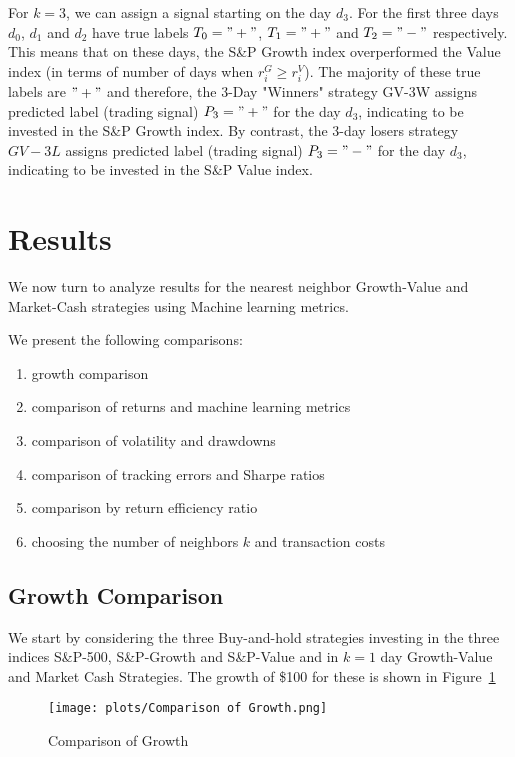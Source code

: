 \documentclass{article}
\begin{document}
For $k=3$,  we can assign a signal starting on the day $d_{3}$. For the first three 
days $d_{0}$, $d_{1}$ and $d_{2}$ have true labels 
$T_{0}="+"$, $T_{1}="+"$ and $T_{2}="-"$ respectively. This means that on these days, 
the S{\&}P  Growth index overperformed the Value index (in terms of number of days 
when $r_{i}^{G} \geq r_{i}^{V}$). The majority of these true labels are $"+"$ and 
therefore, the 3-Day "Winners" strategy GV-3W assigns predicted label 
(trading signal) $P_{3}="+"$ for the day $d_{3}$, indicating to be invested in
the S{\&}P Growth index. By contrast, the 3-day losers strategy $GV-3L$ assigns 
predicted label (trading signal) $P_{3}="-"$ for the day $d_{3}$, indicating to 
be invested in the S{\&}P Value index. 


\section{Results}\label{section:results}

We now turn to analyze results for the nearest neighbor Growth-Value and 
Market-Cash strategies using Machine learning metrics.
\medskip

We present the following comparisons:
\begin{enumerate}[nosep]
    \item growth comparison
    \item comparison of returns and machine learning metrics
    \item comparison of volatility and drawdowns
    \item comparison of tracking errors and Sharpe ratios
    \item comparison by return efficiency ratio
    \item choosing the number of neighbors $k$ and transaction costs
\end{enumerate}

\subsection{Growth Comparison}\label{subsec:growth_comparison}

We start by considering the three Buy-and-hold strategies investing in the three 
indices S{\&}P-500, S{\&}P-Growth and S{\&}P-Value and in $k=1$ day Growth-Value 
and Market Cash Strategies. 
The growth of {\$}100 for these is shown in Figure~\ref{fig:Comparison of Growth}

\begin{figure}[htbp]
  \centering
  \texttt{[image: plots/Comparison of Growth.png]}
  \caption{Comparison of Growth}
  \label{fig:Comparison of Growth}
\end{figure}
\end{document}
